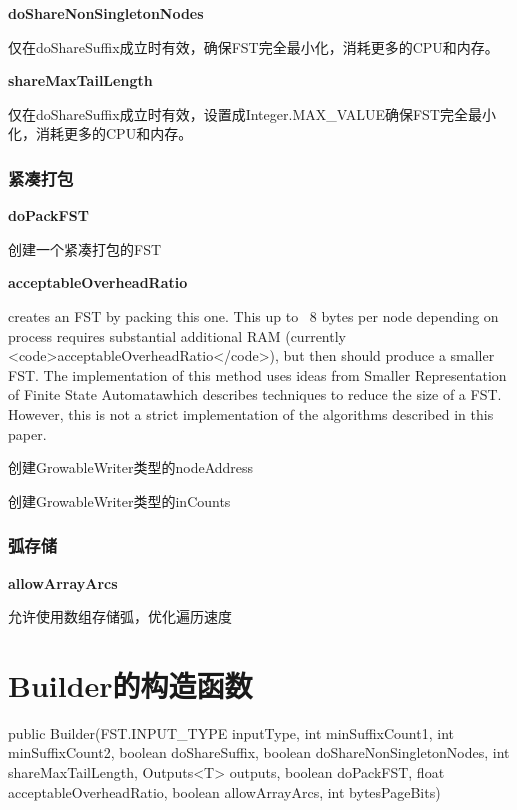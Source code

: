 \documentclass{article}
\begin{document}
\textbf{doShareNonSingletonNodes}

仅在doShareSuffix成立时有效，确保FST完全最小化，消耗更多的CPU和内存。

\textbf{shareMaxTailLength}

仅在doShareSuffix成立时有效，设置成Integer.MAX\_VALUE确保FST完全最小化，消耗更多的CPU和内存。

\subsubsection{紧凑打包}

\textbf{doPackFST}

创建一个紧凑打包的FST

\textbf{acceptableOverheadRatio}

creates an FST by packing this one.  This up to ~8 bytes per node depending on process requires substantial additional RAM (currently <code>acceptableOverheadRatio</code>), but then should produce a smaller FST. The implementation of this method uses ideas from Smaller Representation of Finite State Automata\cite{daciuk2011smaller}which describes techniques to reduce the size of a FST. However, this is not a strict implementation of the algorithms described in this paper.

创建GrowableWriter类型的nodeAddress

创建GrowableWriter类型的inCounts


\subsubsection{弧存储}

\textbf{allowArrayArcs}

允许使用数组存储弧，优化遍历速度

\section{Builder的构造函数}

public Builder(FST.INPUT\_TYPE inputType, int minSuffixCount1, int minSuffixCount2, boolean doShareSuffix,
                 boolean doShareNonSingletonNodes, int shareMaxTailLength, Outputs<T> outputs,
                 boolean doPackFST, float acceptableOverheadRatio, boolean allowArrayArcs,
                 int bytesPageBits)
                 
\end{document}
